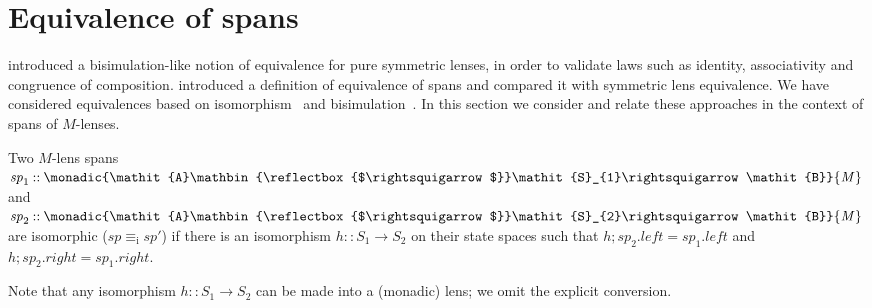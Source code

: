 \documentclass[runningheads]{llncs}
\newcommand{\Conid}[1]{\mathit{#1}}
\newcommand{\Varid}[1]{\mathit{#1}}
\begin{document}
\section{Equivalence of spans}\label{sec:equiv}

\citet{symlens} introduced a bisimulation-like notion of equivalence
for pure symmetric lenses, in order to validate laws such as identity,
associativity and congruence of composition.  \citet{johnson14bx}
introduced a definition of equivalence of spans and compared it with
symmetric lens equivalence.  We have considered equivalences based on
isomorphism~\citep{abousaleh15mpc} and
bisimulation~\citep{abousaleh15bx}.  In this section we consider and
relate these approaches in the context of spans of \ensuremath{\Conid{M}}-lenses.




\begin{definition}
   Two \ensuremath{\Conid{M}}-lens spans \ensuremath{\Varid{sp}_{\mathrm{1}}\mathbin{::}\monadic{\Conid{A}\mathbin{\reflectbox{$\rightsquigarrow$}}\Conid{S}_{1}\rightsquigarrow\Conid{B}}{\Conid{M}}} and \ensuremath{\Varid{sp}_{\mathrm{2}}\mathbin{::}\monadic{\Conid{A}\mathbin{\reflectbox{$\rightsquigarrow$}}\Conid{S}_{2}\rightsquigarrow\Conid{B}}{\Conid{M}}} are isomorphic (\ensuremath{\Varid{sp}\equiv_{\mathrm{i}} \Varid{sp'}}) if there is an isomorphism \ensuremath{\Varid{h}\mathbin{::}\Conid{S}_{1}\to \Conid{S}_{2}} on their
  state spaces such that \ensuremath{\Varid{h}\mathbin{;}\Varid{sp}_{\mathrm{2}}\mathord{.}\Varid{left}\mathrel{=}\Varid{sp}_{\mathrm{1}}\mathord{.}\Varid{left}} and
  \ensuremath{\Varid{h}\mathbin{;}\Varid{sp}_{\mathrm{2}}\mathord{.}\Varid{right}\mathrel{=}\Varid{sp}_{\mathrm{1}}\mathord{.}\Varid{right}}.
\end{definition}
Note that any isomorphism \ensuremath{\Varid{h}\mathbin{::}\Conid{S}_{1}\to \Conid{S}_{2}} can be made into a (monadic)
lens; we omit the explicit conversion.
\end{document}
